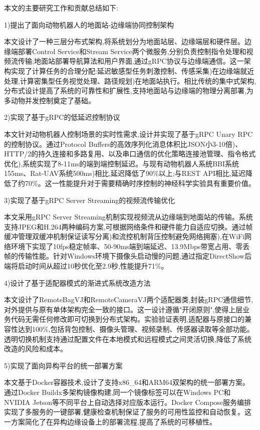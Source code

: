 本文的主要研究工作和贡献总结如下:

1)提出了面向动物机器人的地面站-边缘端协同控制架构

本文设计了一种三层分布式架构,将系统划分为地面站层、边缘端层和硬件层。边缘端部署Control Service和Stream Service两个微服务,分别负责控制指令处理和视频流传输;地面站部署导航算法和用户界面,通过gRPC协议与边缘端通信。这一架构实现了计算任务的合理分配:延迟敏感型任务刺激控制、传感采集)在边缘端就近处理,计算密集型任务视觉处理、路径规划)在地面站执行。相比传统的集中式架构,分布式设计提高了系统的可靠性和扩展性,支持地面站与边缘端的物理分离部署,为多动物并发控制奠定了基础。

2)实现了基于gRPC的低延迟控制协议

本文针对动物机器人控制场景的实时性需求,设计并实现了基于gRPC Unary RPC的控制协议。通过Protocol Buffers的高效序列化消息体积比JSON小3-10倍)、HTTP/2的持久连接和多路复用、以及串口通信的优化策略连接池管理、指令格式优化),系统实现了8-11ms的端到端控制延迟。与现有动物机器人系统BBI系统155ms、Rat-UAV系统500ms)相比,延迟降低了90\%以上;与REST API相比,延迟降低了约70\%。这一性能提升对于需要精确时序控制的神经科学实验具有重要价值。

3)实现了基于gRPC Server Streaming的视频流传输优化

本文采用gRPC Server Streaming机制实现视频流从边缘端到地面站的传输。系统支持JPEG和H.264两种编码方案,可根据网络条件和硬件能力自适应切换。通过帧缓冲管理双缓冲机制保证读写分离)和流控机制背压控制避免网络拥塞),在WiFi网络环境下实现了10fps稳定帧率、50-90ms端到端延迟、13.9Mbps带宽占用、零丢帧的传输性能。针对Windows环境下摄像头启动慢的问题,通过指定DirectShow后端将启动时间从超过10秒优化至2.9秒,性能提升71\%。

4)设计了基于适配器模式的渐进式系统改造方法

本文设计了RemoteBagVJ和RemoteCameraVJ两个适配器类,封装gRPC通信细节,对外提供与原有单体架构完全一致的接口。这一设计遵循"开闭原则",使得上层业务代码无需任何修改即可切换到分布式架构。实验验证表明,适配器与原接口的兼容性达到100\%,包括背包控制、摄像头管理、视频录制、传感器读取等全部功能。透明切换机制支持通过配置文件在本地模式和远程模式之间灵活切换,降低了系统改造的风险和成本。

5)实现了面向异构平台的统一部署方案

本文基于Docker容器技术,设计了支持x86\_64和ARM64双架构的统一部署方案。通过Docker Buildx多架构镜像构建,同一个镜像标签可以在Windows PC和NVIDIA Jetson等不同平台上自动选择对应版本运行。Docker Compose服务编排实现了多服务的一键部署,健康检查机制保证了服务的可用性监控和自动恢复。这一方案简化了在异构边缘设备上的部署流程,提高了系统的可移植性。

